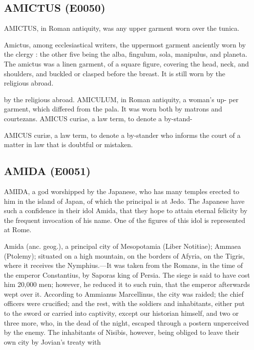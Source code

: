 \documentclass{article}
\begin{document}
\subsection*{AMICTUS (E0050)}
AMICTUS, in Roman antiquity, was any upper garment worn over the tunica.

Amictus, among ecclesiastical writers, the uppermost garment anciently worn by the clergy : the other five being the alba, fingulum, sola, manipulus, and planeta. The amictus was a linen garment, of a square figure, covering the head, neck, and shoulders, and buckled or clasped before the breast. It is still worn by the religious abroad.

by the religious abroad.
AMICULUM, in Roman antiquity, a woman's up-
per garment, which differed from the pala. It was
worn both by matrons and courtezans.
AMICUS curiae, a law term, to denote a by-stand-

AMICUS curiæ, a law term, to denote a by-stander who informs the court of a matter in law that is doubtful or mistaken.

\subsection*{AMIDA (E0051)}
AMIDA, a god worshipped by the Japanese, who has many temples erected to him in the island of Japan, of which the principal is at Jedo. The Japanese have such a confidence in their idol Amida, that they hope to attain eternal felicity by the frequent invocation of his name. One of the figures of this idol is represented at Rome.

Amida (anc. geog.), a principal city of Mesopotamia (Liber Notitiae); Ammaea (Ptolemy); situated on a high mountain, on the borders of Afyria, on the Tigris, where it receives the Nymphius.—It was taken from the Romans, in the time of the emperor Constantius, by Saporas king of Persia. The siege is said to have cost him 20,000 men; however, he reduced it to such ruin, that the emperor afterwards wept over it. According to Ammianus Marcellinus, the city was raided; the chief officers were crucified; and the rest, with the soldiers and inhabitants, either put to the sword or carried into captivity, except our historian himself, and two or three more, who, in the dead of the night, escaped through a postern unperceived by the enemy. The inhabitants of Nisibis, however, being obliged to leave their own city by Jovian's treaty with
\end{document}

